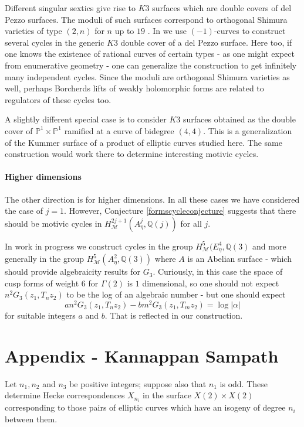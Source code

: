\documentclass[11pt,a4paper]{article}
\newcommand {\Q}{{\mathds Q}}
\newcommand {\M}{{\mathcal M}}
\newcommand {\CP}{{\mathds P}}
\newcommand {\CPP}{\CP^1 \times \CP^1}
\begin{document}
Different singular sextics give rise to $K3$ surfaces which are double covers of del Pezzo surfaces. The moduli of such surfaces correspond to orthogonal Shimura varieties of type $(2,n)$ for $n$ up to $19$ \cite{yuzh}. In \cite{sree-delpezzo} we use $(-1)$-curves to construct several cycles in the generic $K3$ double cover of a del Pezzo surface. Here too, if one knows the existence of rational curves of certain types - as one might expect from enumerative geometry - one can generalize the construction to get infinitely many independent cycles. Since the moduli are orthogonal Shimura varieties as well, perhaps  Borcherds lifts of weakly holomorphic forms are related to regulators of these cycles too. 

A slightly different special case is to consider $K3$ surfaces obtained as the double cover of $\CPP$ ramified at a curve of bidegree $(4,4)$. This is a generalization of the Kummer surface of a product of elliptic curves studied here. The same construction would work there to determine interesting motivic cycles. 



 
\subsection{Higher dimensions}

The other direction is for higher dimensions. In all these cases we have considered the case of $j=1$. However, Conjecture \ref{formscycleconjecture} suggests that there should be motivic cycles in $H^{2j+1}_{\M}(A^j_{\eta},\Q(j))$ for all $j$. 


In work in progress \cite{sree-products} we construct cycles in the group $H^5_{\M}(E_{\eta}^4,\Q(3)$ and more generally in the group $H^5_{\M}(A^2_{\eta},\Q(3))$ where $A$ is an Abelian surface - which should provide algebraicity results for $G_3$. Curiously, in this case the space of cusp forms of weight $6$ for $\Gamma(2)$  is $1$ dimensional, so one should not expect $n^2G_3(z_1,T_nz_2)$ to be the log of an algebraic number - but one should expect 
%
$$a n^2G_3(z_1,T_nz_2)-bm^2G_3(z_1,T_mz_2)=\log|\alpha|$$
%
for suitable integers $a$ and $b$. That is reflected in our construction.



\part{Appendix - Kannappan Sampath}

Let $n_1, n_2$ and $n_3$ be positive integers; suppose also that $n_1$ is odd. These determine Hecke correspondences $X_{n_i}$ in the surface $X(2) \times X(2)$ corresponding to those pairs of elliptic curves which have an isogeny of degree $n_i$ between them.
\end{document}
